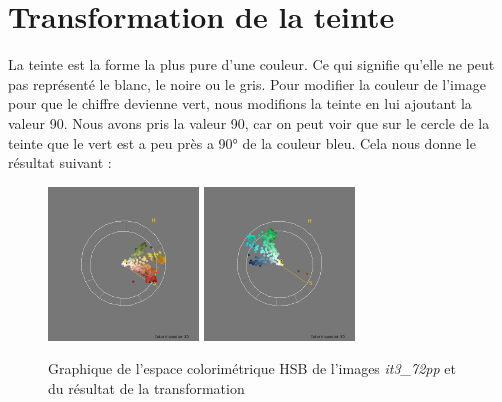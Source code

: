 \documentclass[a4paper,10pt]{article}
\begin{document}
\section{Transformation de la teinte}
La teinte est la forme la plus pure d'une couleur. Ce qui signifie qu'elle ne peut pas représenté le blanc, le noire ou le gris.
Pour modifier la couleur de l'image pour que le chiffre devienne vert, nous modifions la teinte en lui ajoutant la valeur 90.
Nous avons pris la valeur 90, car on peut voir que sur le cercle de la teinte que le vert est a peu près a 90° de la couleur bleu.
Cela nous donne le résultat suivant : 
\begin{figure}[!h]
 \begin{center}
 \includegraphics[width=4cm]{resultat/teinte1.png}
 \includegraphics[width=4cm]{resultat/teinte2.png}
 \caption{Graphique de l'espace colorimétrique HSB de l'images \textit{it3\_72pp} et du résultat de la transformation}
 \end{center}
\end{figure}
\end{document}
